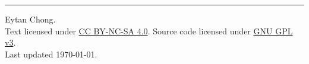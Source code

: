 \begin{titlepage}
    \vspace*{\fill}
    \hrule
    \medbreak
    {\small
    \noindent {\copyright} {\the\year} Eytan Chong.\\
    \noindent Text licensed under \href{https://creativecommons.org/licenses/by-nc-sa/4.0/}{CC BY-NC-SA 4.0}. Source code licensed under \href{https://www.gnu.org/licenses/gpl-3.0-standalone.html}{GNU GPL v3}.\\[0.4cm]
    \noindent Last updated \today.
    }
\end{titlepage}